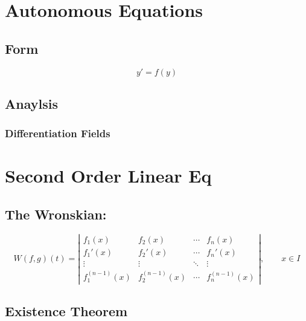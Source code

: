 \documentclass[11pt]{article}
\begin{document}
\section{Autonomous Equations}
\label{sec-10}

\subsection{Form}
\label{sec-10.1}

   \begin{equation}
   y'=f(y)
   \end{equation}
\subsection{Anaylsis}
\label{sec-10.2}

\subsubsection{Differentiation Fields}
\label{sec-10.2.1}

\section{Second Order Linear Eq}
\label{sec-11}

\subsection{The Wronskian:}
\label{sec-11.1}

\begin{equation}
W(f,g)(t) = \left |
\begin{array}{cccc}
         f_1(x) & f_2(x) & \cdots & f_n(x) \\
         f_1'(x) & f_2'(x) & \cdots & f_n' (x)\\
         \vdots & \vdots & \ddots & \vdots \\
         f_1^{(n-1)}(x)& f_2^{(n-1)}(x) & \cdots & f_n^{(n-1)}(x)
\end{array} \right |,\qquad x\in I
\end{equation}

\subsection{Existence Theorem}
\label{sec-11.2}
\end{document}
